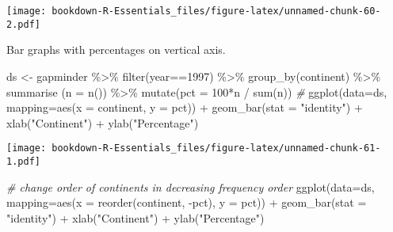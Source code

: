 \documentclass[
]{book}
\newenvironment{Shaded}{\begin{snugshade}}{\end{snugshade}}
\newcommand{\AttributeTok}[1]{\textcolor[rgb]{0.77,0.63,0.00}{#1}}
\newcommand{\CommentTok}[1]{\textcolor[rgb]{0.56,0.35,0.01}{\textit{#1}}}
\newcommand{\DecValTok}[1]{\textcolor[rgb]{0.00,0.00,0.81}{#1}}
\newcommand{\FunctionTok}[1]{\textcolor[rgb]{0.00,0.00,0.00}{#1}}
\newcommand{\NormalTok}[1]{#1}
\newcommand{\OtherTok}[1]{\textcolor[rgb]{0.56,0.35,0.01}{#1}}
\newcommand{\SpecialCharTok}[1]{\textcolor[rgb]{0.00,0.00,0.00}{#1}}
\newcommand{\StringTok}[1]{\textcolor[rgb]{0.31,0.60,0.02}{#1}}
\begin{document}
\texttt{[image: bookdown-R-Essentials\_files/figure-latex/unnamed-chunk-60-2.pdf]}

Bar graphs with percentages on vertical axis.

\begin{Shaded}
\begin{Highlighting}[]
\NormalTok{ds }\OtherTok{\textless{}{-}}\NormalTok{ gapminder }\SpecialCharTok{\%\textgreater{}\%} 
  \FunctionTok{filter}\NormalTok{(year}\SpecialCharTok{==}\DecValTok{1997}\NormalTok{) }\SpecialCharTok{\%\textgreater{}\%} 
  \FunctionTok{group\_by}\NormalTok{(continent)  }\SpecialCharTok{\%\textgreater{}\%}
  \FunctionTok{summarise}\NormalTok{ (}\AttributeTok{n =} \FunctionTok{n}\NormalTok{()) }\SpecialCharTok{\%\textgreater{}\%}
  \FunctionTok{mutate}\NormalTok{(}\AttributeTok{pct =} \DecValTok{100}\SpecialCharTok{*}\NormalTok{n }\SpecialCharTok{/} \FunctionTok{sum}\NormalTok{(n)) }
\CommentTok{\#}
\FunctionTok{ggplot}\NormalTok{(}\AttributeTok{data=}\NormalTok{ds, }\AttributeTok{mapping=}\FunctionTok{aes}\NormalTok{(}\AttributeTok{x =}\NormalTok{ continent, }\AttributeTok{y =}\NormalTok{ pct)) }\SpecialCharTok{+} 
  \FunctionTok{geom\_bar}\NormalTok{(}\AttributeTok{stat =} \StringTok{"identity"}\NormalTok{) }\SpecialCharTok{+} 
  \FunctionTok{xlab}\NormalTok{(}\StringTok{"Continent"}\NormalTok{) }\SpecialCharTok{+} \FunctionTok{ylab}\NormalTok{(}\StringTok{"Percentage"}\NormalTok{)}
\end{Highlighting}
\end{Shaded}

\texttt{[image: bookdown-R-Essentials\_files/figure-latex/unnamed-chunk-61-1.pdf]}

\begin{Shaded}
\begin{Highlighting}[]
\CommentTok{\# change order of continents in decreasing frequency order}
\FunctionTok{ggplot}\NormalTok{(}\AttributeTok{data=}\NormalTok{ds, }\AttributeTok{mapping=}\FunctionTok{aes}\NormalTok{(}\AttributeTok{x =} \FunctionTok{reorder}\NormalTok{(continent, }\SpecialCharTok{{-}}\NormalTok{pct), }\AttributeTok{y =}\NormalTok{ pct)) }\SpecialCharTok{+} 
  \FunctionTok{geom\_bar}\NormalTok{(}\AttributeTok{stat =} \StringTok{"identity"}\NormalTok{) }\SpecialCharTok{+} 
  \FunctionTok{xlab}\NormalTok{(}\StringTok{"Continent"}\NormalTok{) }\SpecialCharTok{+} \FunctionTok{ylab}\NormalTok{(}\StringTok{"Percentage"}\NormalTok{)}
\end{Highlighting}
\end{Shaded}
\end{document}
